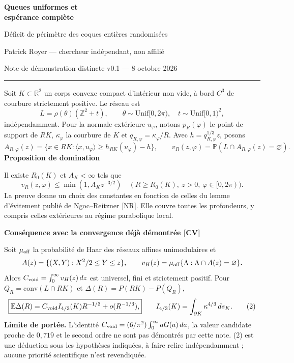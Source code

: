 \documentclass[11pt,a4paper]{article}
\newcommand{\R}{\mathbb R}\newcommand{\Z}{\mathbb Z}
\newcommand{\E}{\mathbb E}\newcommand{\Prb}{\mathbb P}
\newcommand{\head}[1]{\vspace{3pt}{\large\bfseries\color{navy}#1}\par}
\newcommand{\subhead}[1]{{\bfseries\color{navy}#1}\par}
\begin{document}
{\LARGE\bfseries\color{navy}Queues uniformes et\\[3pt]espérance complète}\par
{\large Déficit de périmètre des coques entières randomisées}\par
Patrick Royer --- chercheur indépendant, non affilié\par
Note de démonstration distincte v0.1 --- 8 octobre 2026\par
\vspace{3pt}\hrule\vspace{6pt}

\head{1. Énoncé et portée}
Soit $K\subset\R^2$ un corps convexe compact d'intérieur non vide, à bord $C^3$ de courbure strictement positive. Le réseau est
\[
 L=\rho(\theta)(\Z^2+t),\qquad
 \theta\sim\mathrm{Unif}[0,2\pi),\quad t\sim\mathrm{Unif}[0,1)^2,
\]
indépendamment. Pour la normale extérieure $u_\varphi$, notons $p_R(\varphi)$ le point de support de $RK$, $\kappa_\varphi$ la courbure de $K$ et $q_{R,\varphi}=\kappa_\varphi/R$. Avec $h=q_{R,\varphi}^{1/3}z$, posons
\[
 A_{R,\varphi}(z)=\{x\in RK:\langle x,u_\varphi\rangle
       \ge h_{RK}(u_\varphi)-h\},\qquad
 v_R(z,\varphi)=\Prb(L\cap A_{R,\varphi}(z)=\varnothing).
\]
\subhead{Proposition de domination}
Il existe $R_0(K)$ et $A_K<\infty$ tels que
\[
 \boxed{v_R(z,\varphi)\le\min(1,A_Kz^{-3/2})}
 \quad(R\ge R_0(K),\ z>0,\ \varphi\in[0,2\pi)).
 \tag{1}
\]
La preuve donne un choix des constantes en fonction de celles du lemme d'évitement publié de Ngoc--Reitzner [NR]. Elle couvre toutes les profondeurs, y compris celles extérieures au régime parabolique local.

\subhead{Conséquence avec la convergence déjà démontrée [CV]}
Soit $\mu_{\rm aff}$ la probabilité de Haar des réseaux affines unimodulaires et
\[
 A(z)=\{(X,Y):X^2/2\le Y\le z\},\qquad
 v_H(z)=\mu_{\rm aff}\{\Lambda:\Lambda\cap A(z)=\varnothing\}.
\]
Alors $C_{\rm void}=\int_0^\infty v_H(z)\,dz$ est universel, fini et strictement positif. Pour $Q_R=\mathrm{conv}(L\cap RK)$ et $\Delta(R)=P(RK)-P(Q_R)$,
\[
 \boxed{\E\Delta(R)=C_{\rm void}I_{4/3}(K)R^{-1/3}
                           +o(R^{-1/3}),}\qquad
 I_{4/3}(K)=\int_{\partial K}\kappa^{4/3}\,ds_K.
 \tag{2}
\]
\textbf{Limite de portée.} L'identité $C_{\rm void}=(6/\pi^2)\int_0^\infty aG(a)\,da$, la valeur candidate proche de $0,719$ et le second ordre ne sont pas démontrés par cette note. (2) est une déduction sous les hypothèses indiquées, à faire relire indépendamment ; aucune priorité scientifique n'est revendiquée.
\end{document}

